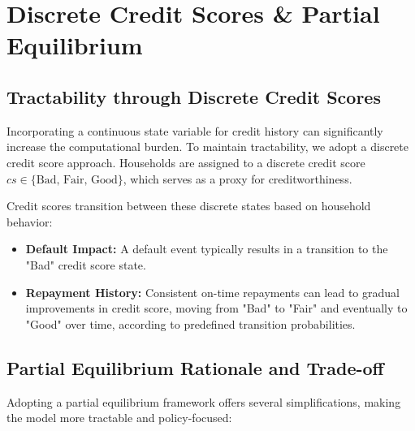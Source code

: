 \documentclass[acmsmall]{acmart}
\begin{document}
\section*{Discrete Credit Scores \& Partial Equilibrium}

\subsection*{Tractability through Discrete Credit Scores}

Incorporating a continuous state variable for credit history can significantly increase the computational burden. To maintain tractability, we adopt a discrete credit score approach. Households are assigned to a discrete credit score $cs \in \{\text{Bad, Fair, Good}\}$, which serves as a proxy for creditworthiness.

Credit scores transition between these discrete states based on household behavior:
\begin{itemize}
    \item \textbf{Default Impact:} A default event typically results in a transition to the "Bad" credit score state.
    \item \textbf{Repayment History:} Consistent on-time repayments can lead to gradual improvements in credit score, moving from "Bad" to "Fair" and eventually to "Good" over time, according to predefined transition probabilities.
\end{itemize}

\subsection*{Partial Equilibrium Rationale and Trade-off}

Adopting a partial equilibrium framework offers several simplifications, making the model more tractable and policy-focused:
\end{document}
